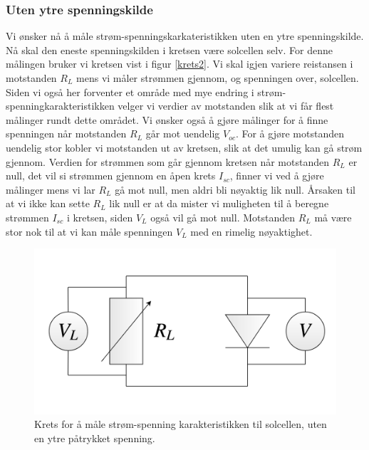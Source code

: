 \documentclass[%
 reprint,
 amsmath,amssymb,
 aps,
 norsk,
 booktabs
]{revtex4-1}
\begin{document}
\subsubsection{Uten ytre spenningskilde}
Vi ønsker nå å måle strøm-spenningskarkateristikken uten en ytre spenningskilde. Nå skal den eneste spenningskilden i kretsen være solcellen selv. For denne målingen bruker vi kretsen vist i figur \vref{krets2}. Vi skal igjen variere reistansen i motstanden $R_L$ mens vi måler strømmen gjennom, og spenningen over, solcellen. Siden vi også her forventer et område med mye endring i strøm-spenningkarakteristikken velger vi verdier av motstanden slik at vi får flest målinger rundt dette området. Vi ønsker også å gjøre målinger for å finne spenningen når motstanden $R_L$ går mot uendelig $V_{oc}$. For å gjøre motstanden uendelig stor kobler vi motstanden ut av kretsen, slik at det umulig kan gå strøm gjennom. Verdien for strømmen som går gjennom kretsen når motstanden $R_L$ er null, det vil si strømmen gjennom en åpen krets $I_{sc}$, finner vi ved å gjøre målinger mens vi lar $R_L$ gå mot null, men aldri bli nøyaktig lik null. Årsaken til at vi ikke kan sette $R_L$ lik null er at da mister vi muligheten til å beregne strømmen $I_{sc}$ i kretsen, siden $V_L$ også vil gå mot null. Motstanden $R_L$ må være stor nok til at vi kan måle spenningen $V_L$ med en rimelig nøyaktighet.
\begin{figure}[h!]
  \centering
  \includegraphics[scale=0.19]{krets2.png}
  \caption{Krets for å måle strøm-spenning karakteristikken til solcellen, uten en ytre påtrykket spenning.}
  \label{krets2}
\end{figure}
\end{document}
